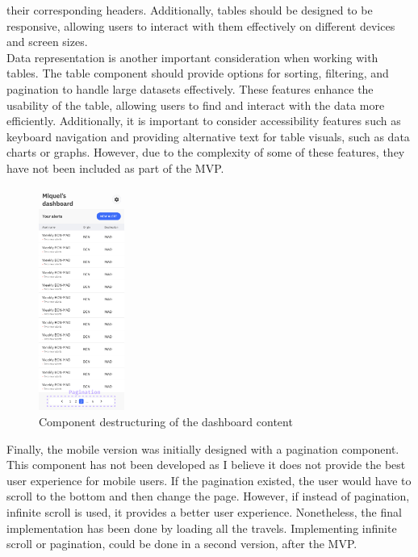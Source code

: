 \documentclass[./memory.tex]{subfiles}
\begin{document}
their corresponding headers. Additionally, tables should be designed to be
responsive, allowing users to interact with them effectively on different
devices and screen sizes.
\\
Data representation is another important consideration when working with tables.
The table component should provide options for sorting, filtering, and
pagination to handle large datasets effectively. These features enhance the
usability of the table, allowing users to find and interact with the data more
efficiently. Additionally, it is important to consider accessibility features
such as keyboard navigation and providing alternative text for table visuals,
such as data charts or graphs. However, due to the complexity of some of these
features, they have not been included as part of the MVP.
\begin{figure}[H]
	\centering
	\includegraphics[width=0.25\textwidth]{./assets/designs/dashboard-sm-pagination.png}
	\caption{Component destructuring of the dashboard content}
\end{figure}
Finally, the mobile version was initially designed with a pagination component.
This component has not been developed as I believe it does not provide the best
user experience for mobile users. If the pagination existed, the user would have
to scroll to the bottom and then change the page. However, if instead of
pagination, infinite scroll is used, it provides a better user experience.
Nonetheless, the final implementation has been done by loading all the travels.
Implementing infinite scroll or pagination, could be done in a second version,
after the MVP.
\end{document}
